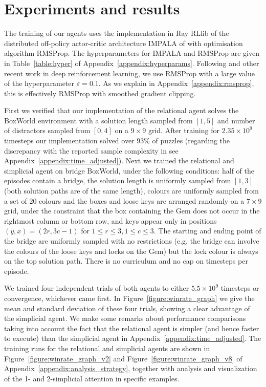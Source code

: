 \documentclass{article} %
\begin{document}
\section{Experiments and results}
\label{section:experiments}

The training of our agents uses the implementation in Ray RLlib \citep{rllib} of the distributed off-policy actor-critic architecture IMPALA of \citep{impala} with optimisation algorithm RMSProp. The hyperparameters for IMPALA and RMSProp are given in Table~\ref{table:hyper} of Appendix~\ref{appendix:hyperparams}. Following \citep{zambaldi} and other recent work in deep reinforcement learning, we use RMSProp with a large value of the hyperparameter $\varepsilon = 0.1$. As we explain in Appendix~\ref{appendix:rmsprop}, this is effectively RMSProp with smoothed gradient clipping.

First we verified that our implementation of the relational agent solves the BoxWorld environment \citep{zambaldi} with a solution length sampled from $[1,5]$ and number of distractors sampled from $[0,4]$ on a $9\times 9$ grid. After training for $2.35 \times 10^9$ timesteps our implementation solved over $93\%$ of puzzles (regarding the discrepancy with the reported sample complexity in \citep{zambaldi} see Appendix~\ref{appendix:time_adjusted}). Next we trained the relational and simplicial agent on bridge BoxWorld, under the following conditions: half of the episodes contain a bridge, the solution length is uniformly sampled from $[1,3]$ (both solution paths are of the same length), colours are uniformly sampled from a set of $20$ colours and the boxes and loose keys are arranged randomly on a $7 \times 9$ grid, under the constraint that the box containing the Gem does not occur in the rightmost column or bottom row, and keys appear only in positions $(y,x) = (2r, 3c-1)$ for $1 \le r \le 3, 1 \le c \le 3$. The starting and ending point of the bridge are uniformly sampled with no restrictions (e.g. the bridge can involve the colours of the loose keys and locks on the Gem) but the lock colour is always on the top solution path. There is no curriculum and no cap on timesteps per episode. %

We trained four independent trials of both agents to either $5.5\times 10^9$ timesteps or convergence, whichever came first. In Figure~\ref{figure:winrate_graph} we give the mean and standard deviation of these four trials, showing a clear advantage of the simplicial agent.  We make some remarks about performance comparisons taking into account the fact that the relational agent is simpler (and hence faster to execute) than the simplicial agent in Appendix~\ref{appendix:time_adjusted}.  The training runs for the relational and simplicial agents are shown in Figure~\ref{figure:winrate_graph_v2} and Figure~\ref{figure:winrate_graph_v8} of Appendix~\ref{appendix:analysis_strategy}, together with analysis and visualization of the 1- and 2-simplicial attention in specific examples. 
\end{document}
